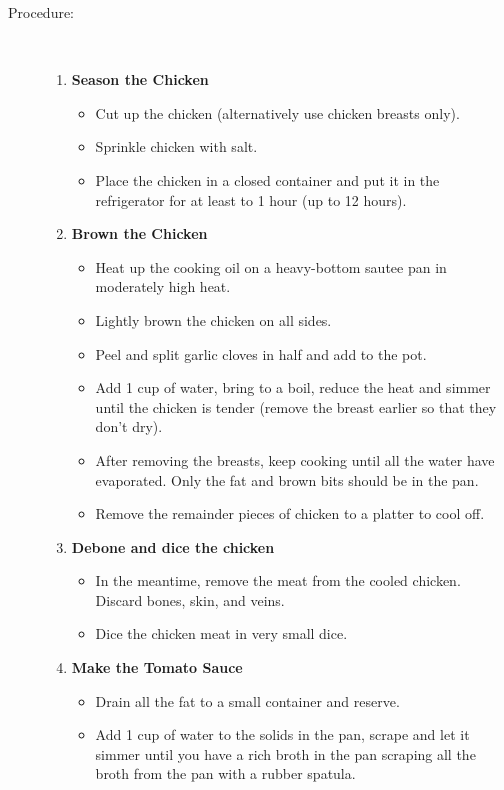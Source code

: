 \documentclass[11pt,letterpaper]{article}
\begin{document}
\begin{description}
\item[Procedure:]\ \\
	\begin{enumerate}
	\item{\bf Season the Chicken}
	\begin{itemize}
        \item Cut up the chicken (alternatively use chicken breasts only).
        \item Sprinkle chicken with salt.
        \item Place the chicken in a closed container and put it in
              the refrigerator for at least to 1 hour (up to 12 hours).
        \end{itemize}
        \item{\bf Brown the Chicken}
        \begin{itemize}
        \item Heat up the cooking oil on a heavy-bottom sautee pan in moderately high heat.
        \item Lightly brown the chicken on all sides.
        \item Peel and split garlic cloves in half and add to the pot.
        \item Add 1 cup of water, bring to a boil, reduce
          the heat and simmer until the chicken is tender (remove the breast earlier so that they don't dry).
        \item After removing the breasts, keep cooking until all the water have evaporated. Only the fat and brown bits should be in the pan.
        \item Remove the remainder pieces of chicken to a platter to cool off.
        \end{itemize}
         \item{\bf Debone and dice the chicken}
        \begin{itemize}
        \item In the meantime, remove the meat from the cooled chicken. Discard bones, skin, and veins.
        \item Dice the chicken meat in very small dice.
         \end{itemize}
        \item{\bf Make the Tomato Sauce}
        \begin{itemize}
        \item Drain all the fat to a small container and reserve.
        \item Add 1 cup of water to the solids in the pan, scrape and let it simmer until you have a rich broth in the pan scraping all the broth from the pan with a rubber spatula.

\end{itemize}
\end{enumerate}
\end{description}
\end{document}
